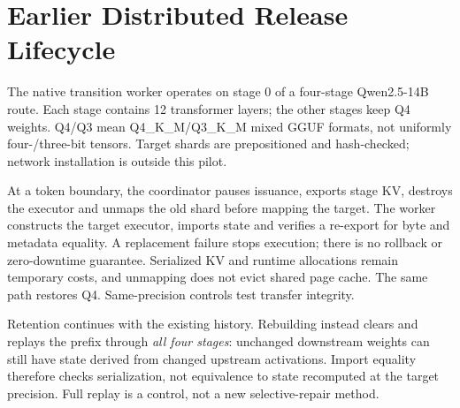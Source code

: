 \documentclass{article}
\begin{document}
\section{Earlier Distributed Release Lifecycle}

The native transition worker operates on stage 0 of a four-stage Qwen2.5-14B
route. Each stage contains 12 transformer layers; the other stages keep Q4
weights. Q4/Q3 mean Q4\_K\_M/Q3\_K\_M mixed GGUF formats, not uniformly
four-/three-bit tensors. Target shards are prepositioned and hash-checked;
network installation is outside this pilot.

At a token boundary, the coordinator pauses issuance, exports stage KV,
destroys the executor and unmaps the old shard before mapping the target.
The worker constructs the target executor, imports state and verifies a
re-export for byte and metadata equality. A replacement failure stops execution;
there is no rollback or zero-downtime guarantee. Serialized KV and runtime
allocations remain temporary costs, and unmapping does not evict shared page
cache. The same path restores Q4. Same-precision controls test transfer integrity.


Retention continues with the existing history. Rebuilding instead clears and
replays the prefix through \emph{all four stages}: unchanged downstream weights
can still have state derived from changed upstream activations. Import equality
therefore checks serialization, not equivalence to state recomputed at the
target precision. Full replay is a control, not a new selective-repair method.



\end{document}
